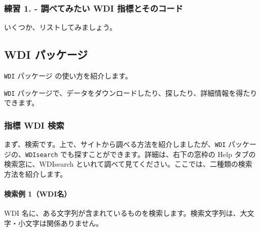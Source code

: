 \documentclass[
]{bxjsbook}
\theoremstyle{definition}
\theoremstyle{definition}
\theoremstyle{definition}
\theoremstyle{definition}
\theoremstyle{remark}
\begin{document}
\hypertarget{ux7df4ux7fd2-1.---ux8abfux3079ux3066ux307fux305fux3044-wdi-ux6307ux6a19ux3068ux305dux306eux30b3ux30fcux30c9}{%
\subsubsection{練習 1. - 調べてみたい WDI 指標とそのコード}\label{ux7df4ux7fd2-1.---ux8abfux3079ux3066ux307fux305fux3044-wdi-ux6307ux6a19ux3068ux305dux306eux30b3ux30fcux30c9}}

いくつか、リストしてみましょう。

\hypertarget{wdi-ux30d1ux30c3ux30b1ux30fcux30b8}{%
\subsection{WDI パッケージ}\label{wdi-ux30d1ux30c3ux30b1ux30fcux30b8}}

\texttt{WDI} パッケージ の使い方を紹介します。

\texttt{WDI} パッケージで、データをダウンロードしたり、探したり、詳細情報を得たりできます。

\hypertarget{ux6307ux6a19-wdi-ux691cux7d22}{%
\subsubsection{指標 WDI 検索}\label{ux6307ux6a19-wdi-ux691cux7d22}}

まず、検索です。上で、サイトから調べる方法を紹介しましたが、\texttt{WDI} パッケージの、\texttt{WDIsearch} でも探すことができます。詳細は、右下の窓枠の Help タブの検索窓に、WDIsearch といれて調べて見てください。ここでは、二種類の検索方法を紹介します。

\hypertarget{ux691cux7d22ux4f8b-1wdiux540d}{%
\paragraph{検索例 1（WDI名）}\label{ux691cux7d22ux4f8b-1wdiux540d}}

WDI 名に、ある文字列が含まれているものを検索します。検索文字列は、大文字・小文字は関係ありません。
\end{document}
